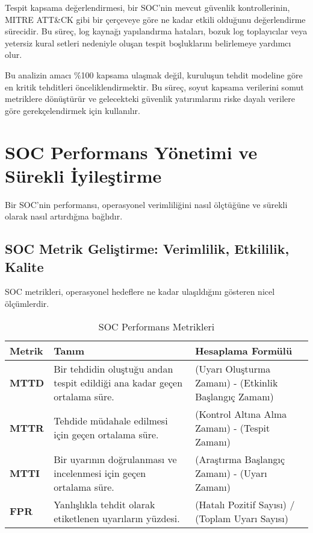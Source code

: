 Tespit kapsama değerlendirmesi, bir SOC'nin mevcut güvenlik kontrollerinin, MITRE ATT\&CK gibi bir çerçeveye göre ne kadar etkili olduğunu değerlendirme sürecidir. Bu süreç, log kaynağı yapılandırma hataları, bozuk log toplayıcılar veya yetersiz kural setleri nedeniyle oluşan tespit boşluklarını belirlemeye yardımcı olur.

Bu analizin amacı \%100 kapsama ulaşmak değil, kuruluşun tehdit modeline göre en kritik tehditleri önceliklendirmektir. Bu süreç, soyut kapsama verilerini somut metriklere dönüştürür ve gelecekteki güvenlik yatırımlarını riske dayalı verilere göre gerekçelendirmek için kullanılır.

\section{SOC Performans Yönetimi ve Sürekli İyileştirme}

Bir SOC'nin performansı, operasyonel verimliliğini nasıl ölçtüğüne ve sürekli olarak nasıl artırdığına bağlıdır.

\subsection{SOC Metrik Geliştirme: Verimlilik, Etkililik, Kalite}

SOC metrikleri, operasyonel hedeflere ne kadar ulaşıldığını gösteren nicel ölçümlerdir.

\begin{table}[htbp]
\caption{SOC Performans Metrikleri}
\begin{tabularx}{\textwidth}{|X|X|X|}
\hline
\textbf{Metrik} & \textbf{Tanım} & \textbf{Hesaplama Formülü}  \\
\hline
\textbf{MTTD} & Bir tehdidin oluştuğu andan tespit edildiği ana kadar geçen ortalama süre. & (Uyarı Oluşturma Zamanı) - (Etkinlik Başlangıç Zamanı)  \\
\hline
\textbf{MTTR} & Tehdide müdahale edilmesi için geçen ortalama süre. & (Kontrol Altına Alma Zamanı) - (Tespit Zamanı)  \\
\hline
\textbf{MTTI} & Bir uyarının doğrulanması ve incelenmesi için geçen ortalama süre. & (Araştırma Başlangıç Zamanı) - (Uyarı Zamanı)  \\
\hline
\textbf{FPR} & Yanlışlıkla tehdit olarak etiketlenen uyarıların yüzdesi. & (Hatalı Pozitif Sayısı) / (Toplam Uyarı Sayısı)  \\
\hline
\end{tabularx}
\end{table}

